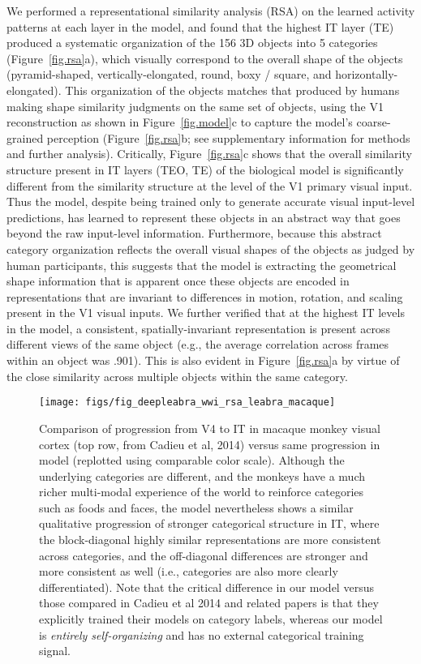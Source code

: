 \documentclass[12pt,twoside]{naturefigs}  %
\newif\myifpdf
\begin{document}
We performed a representational similarity analysis (RSA) on the learned activity patterns at each layer in the model, and found that the highest IT layer (TE) produced a systematic organization of the 156 3D objects into 5 categories (Figure~\ref{fig.rsa}a), which visually correspond to the overall shape of the objects (pyramid-shaped, vertically-elongated, round, boxy / square, and horizontally-elongated). This organization of the objects matches that produced by humans making shape similarity judgments on the same set of objects, using the V1 reconstruction as shown in Figure~\ref{fig.model}c to capture the model's coarse-grained perception (Figure~\ref{fig.rsa}b; see supplementary information for methods and further analysis).  Critically, Figure~\ref{fig.rsa}c shows that the overall similarity structure present in IT layers (TEO, TE) of the biological model is significantly different from the similarity structure at the level of the V1 primary visual input.  Thus the model, despite being trained only to generate accurate visual input-level predictions, has learned to represent these objects in an abstract way that goes beyond the raw input-level information.  Furthermore, because this abstract category organization reflects the overall visual shapes of the objects as judged by human participants, this suggests that the model is extracting the geometrical shape information that is apparent once these objects are encoded in representations that are  invariant to differences in motion, rotation, and scaling present in the V1 visual inputs.  We further verified that at the highest IT levels in the model, a consistent, spatially-invariant representation is present across different views of the same object (e.g., the average correlation across frames within an object was .901).  This is also evident in Figure~\ref{fig.rsa}a by virtue of the close similarity across multiple objects within the same category.

\begin{figure}
  \centering\texttt{[image: figs/fig\_deepleabra\_wwi\_rsa\_leabra\_macaque]}
  \caption{\small \protect{} Comparison of progression from V4 to IT in macaque monkey visual cortex (top row, from Cadieu et al, 2014) versus same progression in model (replotted using comparable color scale).  Although the underlying categories are different, and the monkeys have a much richer multi-modal experience of the world to reinforce categories such as foods and faces, the model nevertheless shows a similar qualitative progression of stronger categorical structure in IT, where the block-diagonal highly similar representations are more consistent across categories, and the off-diagonal differences are stronger and more consistent as well (i.e., categories are also more clearly differentiated).  Note that the critical difference in our model versus those compared in Cadieu et al 2014 and related papers is that they explicitly trained their models on category labels, whereas our model is {\em entirely self-organizing} and has no external categorical training signal.}
  \label{fig.macaque}
\end{figure}
\end{document}
